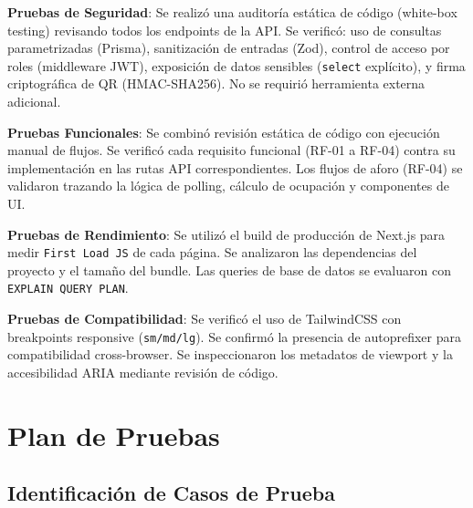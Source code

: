 \textbf{Pruebas de Seguridad}: Se realizó una auditoría estática de código (white-box testing) revisando todos los endpoints de la API. Se verificó: uso de consultas parametrizadas (Prisma), sanitización de entradas (Zod), control de acceso por roles (middleware JWT), exposición de datos sensibles (\texttt{select} explícito), y firma criptográfica de QR (HMAC-SHA256). No se requirió herramienta externa adicional.

\textbf{Pruebas Funcionales}: Se combinó revisión estática de código con ejecución manual de flujos. Se verificó cada requisito funcional (RF-01 a RF-04) contra su implementación en las rutas API correspondientes. Los flujos de aforo (RF-04) se validaron trazando la lógica de polling, cálculo de ocupación y componentes de UI.

\textbf{Pruebas de Rendimiento}: Se utilizó el build de producción de Next.js para medir \texttt{First Load JS} de cada página. Se analizaron las dependencias del proyecto y el tamaño del bundle. Las queries de base de datos se evaluaron con \texttt{EXPLAIN QUERY PLAN}.

\textbf{Pruebas de Compatibilidad}: Se verificó el uso de TailwindCSS con breakpoints responsive (\texttt{sm/md/lg}). Se confirmó la presencia de autoprefixer para compatibilidad cross-browser. Se inspeccionaron los metadatos de viewport y la accesibilidad ARIA mediante revisión de código.

\section{Plan de Pruebas}

\subsection{Identificación de Casos de Prueba}


